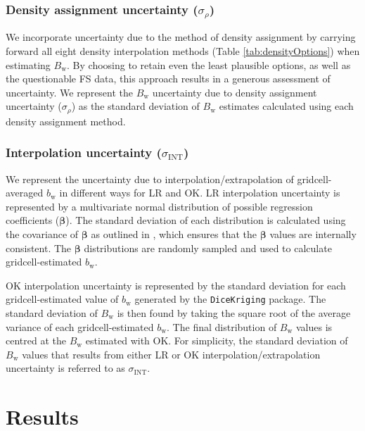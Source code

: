 \documentclass[review,oneside, letterpaper]{igs}
\renewcommand{\vector}[1]{\mathbf{#1}}
\begin{document}
	\subsubsection{Density assignment uncertainty ($\sigma_{\rho}$)}
We incorporate uncertainty due to the method of density assignment by carrying forward all eight density interpolation methods (Table \ref{tab:densityOptions}) when estimating $B_\mathrm{w}$. By choosing to retain even the least plausible options, as well as the questionable FS data, this approach results in a generous assessment of uncertainty. We represent the $B_\mathrm{w}$ uncertainty due to density assignment uncertainty ($\sigma_{\rho}$) as the standard deviation of $B_\mathrm{w}$ estimates calculated using each density assignment method.

	\subsubsection{Interpolation uncertainty ($\sigma_{\mathrm{INT}}$)}
We represent the uncertainty due to interpolation/extrapolation of gridcell-averaged $b_\mathrm{w}$ in different ways for LR and OK. LR interpolation uncertainty is represented by a multivariate normal distribution of possible regression coefficients ($\vector{\beta}$). The standard deviation of each distribution is calculated using the covariance of $\vector{\beta}$ as outlined in \cite{Bagos2015}, which ensures that the $\vector{\beta}$ values are internally consistent. The $\vector{\beta}$ distributions are randomly sampled and used to calculate gridcell-estimated $b_\mathrm{w}$.

OK interpolation uncertainty is represented by the standard deviation for each gridcell-estimated value of $b_\mathrm{w}$ generated by the \texttt{DiceKriging} package. The standard deviation of $B_\mathrm{w}$ is then found by taking the square root of the average variance of each gridcell-estimated $b_\mathrm{w}$. The final distribution of $B_\mathrm{w}$ values is centred at the $B_\mathrm{w}$ estimated with OK. For simplicity, the standard deviation of $B_\mathrm{w}$ values that results from either LR or OK interpolation/extrapolation uncertainty is referred to as $\sigma_{\mathrm{INT}}$.



\section{Results}
\end{document}
